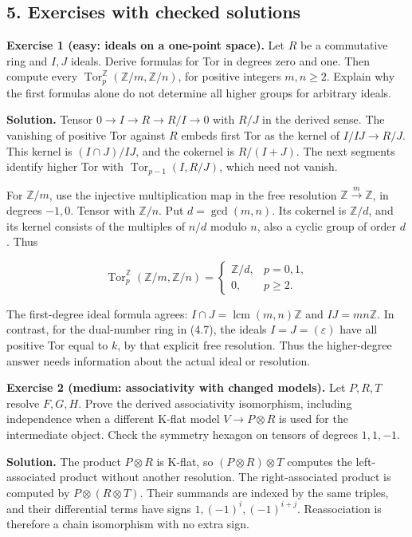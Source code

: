 \documentclass[
  english,
  11pt,
  a4paper,
]{article}
\begin{document}
\subsection{5. Exercises with checked
solutions}\label{derived-tensor-products-and-tor-sheaves--5-exercises-with-checked-solutions}

\textbf{Exercise 1 (easy: ideals on a one-point space).} Let \(R\) be a
commutative ring and \(I,J\) ideals. Derive formulas for Tor in degrees
zero and one. Then compute every
\(\operatorname{Tor}_p^{\mathbb Z}(\mathbb Z/m,\mathbb Z/n)\), for
positive integers \(m,n\ge2\). Explain why the first formulas alone do
not determine all higher groups for arbitrary ideals.

\textbf{Solution.} Tensor \(0\to I\to R\to R/I\to0\) with \(R/J\) in the
derived sense. The vanishing of positive Tor against \(R\) embeds first
Tor as the kernel of \(I/IJ\to R/J\). This kernel is \((I\cap J)/IJ\),
and the cokernel is \(R/(I+J)\). The next segments identify higher Tor
with \(\operatorname{Tor}_{p-1}(I,R/J)\), which need not vanish.

For \(\mathbb Z/m\), use the injective multiplication map in the free
resolution \(\mathbb Z\xrightarrow{m}\mathbb Z\), in degrees \(-1,0\).
Tensor with \(\mathbb Z/n\). Put \(d=\gcd(m,n)\). Its cokernel is
\(\mathbb Z/d\), and its kernel consists of the multiples of \(n/d\)
modulo \(n\), also a cyclic group of order \(d\). Thus

\[\operatorname{Tor}^{\mathbb Z}_p(\mathbb Z/m,\mathbb Z/n)
=
\begin{cases}
\mathbb Z/d,&p=0,1,\\
0,&p\ge2.
\end{cases}\]

The first-degree ideal formula agrees:
\(I\cap J=\operatorname{lcm}(m,n)\mathbb Z\) and \(IJ=mn\mathbb Z\). In
contrast, for the dual-number ring in (4.7), the ideals
\(I=J=(\varepsilon)\) have all positive Tor equal to \(k\), by that
explicit free resolution. Thus the higher-degree answer needs
information about the actual ideal or resolution.

\textbf{Exercise 2 (medium: associativity with changed models).} Let
\(P,R,T\) resolve \(F,G,H\). Prove the derived associativity
isomorphism, including independence when a different K-flat model
\(V\to P\otimes R\) is used for the intermediate object. Check the
symmetry hexagon on tensors of degrees \(1,1,-1\).

\textbf{Solution.} The product \(P\otimes R\) is K-flat, so
\((P\otimes R)\otimes T\) computes the left-associated product without
another resolution. The right-associated product is computed by
\(P\otimes(R\otimes T)\). Their summands are indexed by the same
triples, and their differential terms have signs
\(1,(-1)^i,(-1)^{i+j}\). Reassociation is therefore a chain isomorphism
with no extra sign.
\end{document}
